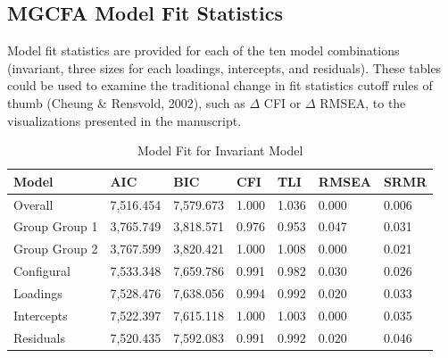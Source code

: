 \documentclass[
  man]{apa7}
\begin{document}
\subsection{MGCFA Model Fit Statistics}\label{mgcfa-model-fit-statistics}

Model fit statistics are provided for each of the ten model combinations (invariant, three sizes for each loadings, intercepts, and residuals). These tables could be used to examine the traditional change in fit statistics cutoff rules of thumb (Cheung \& Rensvold, 2002), such as \(\Delta\) CFI or \(\Delta\) RMSEA, to the visualizations presented in the manuscript.

\begin{table}[tbp]

\begin{center}
\begin{threeparttable}

\caption{\label{tab:tab1}Model Fit for Invariant Model}

\begin{tabular}{lllllll}
\toprule
Model & AIC & BIC & CFI & TLI & RMSEA & SRMR\\
\midrule
Overall & 7,516.454 & 7,579.673 & 1.000 & 1.036 & 0.000 & 0.006\\
Group Group 1 & 3,765.749 & 3,818.571 & 0.976 & 0.953 & 0.047 & 0.031\\
Group Group 2 & 3,767.599 & 3,820.421 & 1.000 & 1.008 & 0.000 & 0.021\\
Configural & 7,533.348 & 7,659.786 & 0.991 & 0.982 & 0.030 & 0.026\\
Loadings & 7,528.476 & 7,638.056 & 0.994 & 0.992 & 0.020 & 0.033\\
Intercepts & 7,522.397 & 7,615.118 & 1.000 & 1.003 & 0.000 & 0.035\\
Residuals & 7,520.435 & 7,592.083 & 0.991 & 0.992 & 0.020 & 0.046\\
\bottomrule
\end{tabular}

\end{threeparttable}
\end{center}

\end{table}
\end{document}
